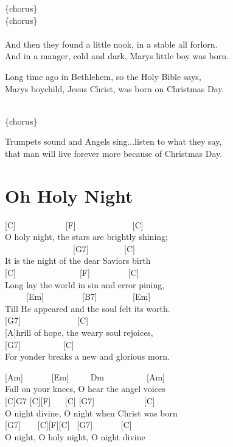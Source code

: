 \documentclass[
  letterpaper,
]{scrbook}
\begin{document}
\{chorus\}\\
\{chorus\}\\
\hspace*{0.333em}\\
And then they found a little nook, in a stable all forlorn.\\
And in a manger, cold and dark, Mary\textquotesingle s little boy was
born.

Long time ago in Bethlehem, so the Holy Bible says, ~\\
Mary\textquotesingle s boychild, Jesus Christ, was born on Christmas
Day.

~\\
\{chorus\}

Trumpets sound and Angels sing...listen to what they say,\\
that man will live forever more because of Christmas Day.

\hypertarget{oh-holy-night}{%
\chapter{Oh Holy Night}\label{oh-holy-night}}

{[}C{]} ~ ~ ~ ~ ~ ~ ~{[}F{]} ~ ~ ~ ~ ~ ~ ~ ~{[}C{]}\\
O holy night, the stars are brightly shining;\\
\hspace*{0.333em} ~ ~ ~ ~ ~ ~ ~ ~ ~ ~{[}G7{]} ~ ~ ~ ~ ~{[}C{]}\\
It is the night of the dear Saviors birth\\
{[}C{]} ~ ~ ~ ~ ~ ~ ~ ~ ~{[}F{]} ~ ~ ~ ~ ~ {[}C{]}\\
Long lay the world in sin and error pining,\\
\hspace*{0.333em} ~ ~ ~ {[}Em{]} ~ ~ ~ ~ ~ {[}B7{]} ~ ~ ~ ~ ~{[}Em{]}\\
Till He appeared and the soul felt its worth.\\
{[}G7{]} ~ ~ ~ ~ ~ ~ ~ ~{[}C{]} ~ ~ ~ ~ ~\\
{[}A{]}hrill of hope, the weary soul rejoices,\\
\hspace*{0.333em} {[}G7{]} ~ ~ ~ ~ ~ ~{[}C{]} ~ ~ ~ ~ ~ ~ ~\\
For yonder breaks a new and glorious morn.

{[}Am{]} ~ ~ ~ ~{[}Em{]} ~ ~ ~Dm ~ ~ ~ ~ ~ ~{[}Am{]}\\
Fall on your knees, O hear the angel voices\\
{[}C{]}G7 {[}C{]}{[}F{]} ~ ~{[}C{]} {[}G7{]} ~ ~ ~ ~ ~ ~ ~{[}C{]}\\
O night divine, O night when Christ was born\\
{[}G7{]} ~ ~ {[}C{]}{[}F{]}{[}C{]} ~{[}G7{]} ~ ~ ~ ~{[}C{]}\\
O night, O holy night, O night divine
\end{document}
